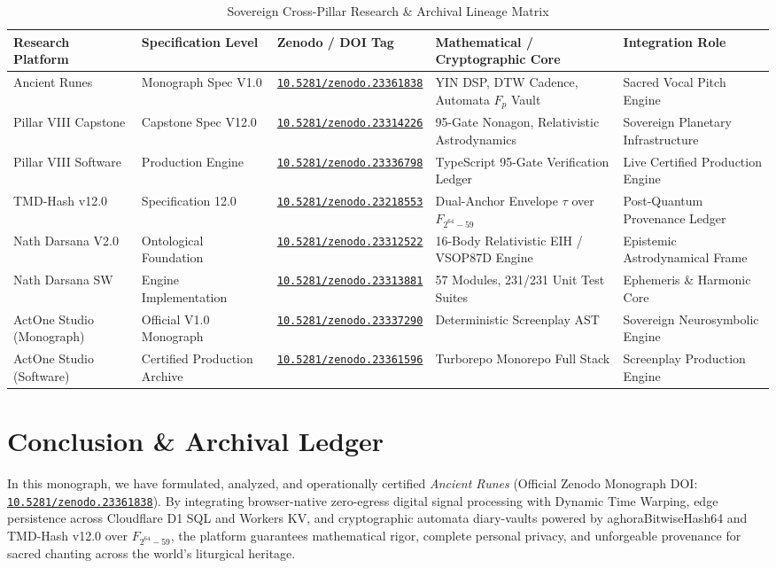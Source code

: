 \documentclass[11pt,a4paper,reqno]{article}
\newcommand{\zenodo}[1]{\href{https://doi.org/10.5281/zenodo.#1}{\nolinkurl{10.5281/zenodo.#1}}}
\def\texttt#1{#1}%
\def\mathbb#1{#1}%
\theoremstyle{plain}
\theoremstyle{definition}
\theoremstyle{remark}
\numberwithin{equation}{section}
\begin{document}
\begin{table}[!ht]
\centering
\caption{Sovereign Cross-Pillar Research \& Archival Lineage Matrix}
\label{tab:sovereign_lineage}
\begin{tabularx}{\textwidth}{P{3.0cm} P{2.6cm} P{3.4cm} P{4.2cm} Y}
\toprule
\textbf{Research Platform} & \textbf{Specification Level} & \textbf{Zenodo / DOI Tag} & \textbf{Mathematical / Cryptographic Core} & \textbf{Integration Role} \\
\midrule
Ancient Runes & Monograph Spec V1.0 & \zenodo{23361838} & YIN DSP, DTW Cadence, Automata $\mathbb{F}_p$ Vault & Sacred Vocal Pitch Engine \\
Pillar VIII Capstone & Capstone Spec V12.0 & \zenodo{23314226} & 95-Gate Nonagon, Relativistic Astrodynamics & Sovereign Planetary Infrastructure \\
Pillar VIII Software & Production Engine & \zenodo{23336798} & TypeScript 95-Gate Verification Ledger & Live Certified Production Engine \\
TMD-Hash v12.0 & Specification 12.0 & \zenodo{23218553} & Dual-Anchor Envelope $\tau$ over $\mathbb{F}_{2^{64}-59}$ & Post-Quantum Provenance Ledger \\
Nath Darsana V2.0 & Ontological Foundation & \zenodo{23312522} & 16-Body Relativistic EIH / VSOP87D Engine & Epistemic Astrodynamical Frame \\
Nath Darsana SW & Engine Implementation & \zenodo{23313881} & 57 Modules, 231/231 Unit Test Suites & Ephemeris \& Harmonic Core \\
ActOne Studio (Monograph) & Official V1.0 Monograph & \zenodo{23337290} & Deterministic Screenplay AST & Sovereign Neurosymbolic Engine \\
ActOne Studio (Software) & Certified Production Archive & \zenodo{23361596} & Turborepo Monorepo Full Stack & Screenplay Production Engine \\
\bottomrule
\end{tabularx}
\end{table}

\section{\texorpdfstring{Conclusion \& Archival Ledger}{Conclusion and Archival Ledger}}
\label{sec:conclusion}

In this monograph, we have formulated, analyzed, and operationally certified \emph{Ancient Runes} (Official Zenodo Monograph DOI: \zenodo{23361838}). By integrating browser-native zero-egress digital signal processing with Dynamic Time Warping, edge persistence across Cloudflare D1 SQL and Workers KV, and cryptographic automata diary-vaults powered by \texttt{aghoraBitwiseHash64} and TMD-Hash v12.0 over $\mathbb{F}_{2^{64}-59}$, the platform guarantees mathematical rigor, complete personal privacy, and unforgeable provenance for sacred chanting across the world's liturgical heritage.
\end{document}
